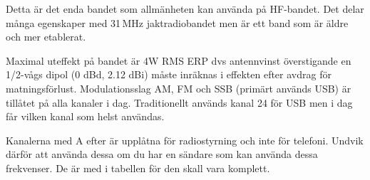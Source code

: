 Detta är det enda bandet som allmänheten kan använda på HF-bandet. Det delar
många egenskaper med 31\,MHz jaktradiobandet men är ett band som är äldre och
mer etablerat.

Maximal uteffekt på bandet är 4W RMS ERP dvs antennvinst överstigande en
1/2-vågs dipol (0 dBd, 2.12 dBi) måste inräknas i effekten efter avdrag för
matningsförlust. Modulationsslag AM, FM och SSB (primärt används USB) är
tillåtet på alla kanaler i dag. Traditionellt används kanal 24 för USB men i dag
får vilken kanal som helst användas.

Kanalerna med A efter är upplåtna för radiostyrning och inte för telefoni.
Undvik därför att använda dessa om du har en sändare som kan använda dessa
frekvenser. De är med i tabellen för den skall vara komplett.

\clearpage

